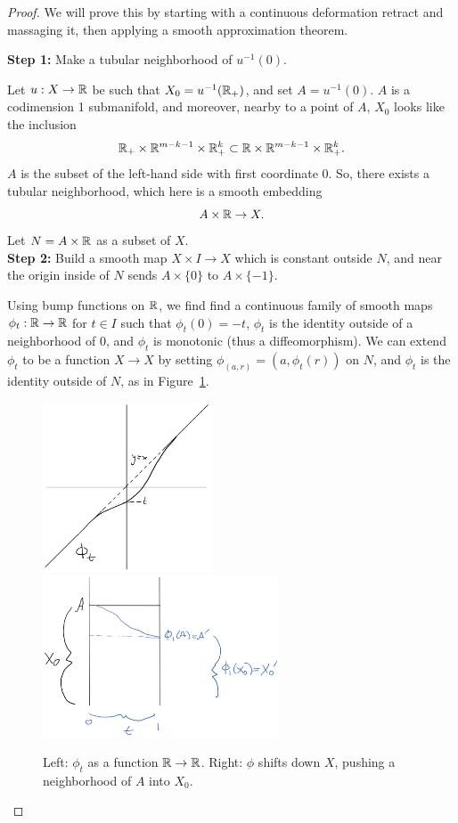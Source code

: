 \documentclass{article}
\newtheorem{proposed work}[theorem]{Proposed Work}
\begin{document}
\begin{proof}
  We will prove this by starting with a continuous deformation retract and massaging it, then applying a smooth approximation theorem.

\noindent  \textbf{Step 1:} Make a tubular neighborhood of $u^{-1}(0)$.

  Let $u:X\to \mathbb R$ be such that $X_0=u^{-1}(\mathbb R_+)$, and set $A=u^{-1}(0)$. $A$ is a codimension 1 submanifold, and moreover, nearby to a point of $A$, $X_0$ looks like the inclusion
  \[  
    \mathbb R_+\times \mathbb R^{m-k-1}\times \mathbb R_+^k\subset \mathbb R\times \mathbb R^{m-k-1}\times \mathbb R^k_+.
  \]
  $A$ is the subset of the left-hand side with first coordinate 0. So, there exists a tubular neighborhood, which here is a smooth embedding
  \[
    A\times \mathbb R\to X.
  \]
  Let $N=A\times \mathbb R$ as a subset of $X$.\\

\noindent  \textbf{Step 2:} Build a smooth map $X\times I\to X$ which is constant outside $N$, and near the origin inside of $N$ sends $A\times\{0\}$ to $A\times\{-1\}$.

  Using bump functions on $\mathbb R$, we find find a continuous family of smooth maps $\phi_t:\mathbb R \to \mathbb R$ for $t\in I$ such that $\phi_t(0)=-t$, $\phi_t$ is the identity outside of a neighborhood of $0$, and $\phi_t$ is monotonic (thus a diffeomorphism). We can extend $\phi_t$ to be a function $X\to X$ by setting $\phi_(a,r)=(a,\phi_t(r))$ on $N$, and $\phi_t$ is the identity outside of $N$, as in Figure~\ref{fig:phi_t}.

  \begin{figure}[h]
    
  \centering
\includegraphics[width=5cm]{phi_t_2}
\includegraphics[width=7cm]{phi_t}
\caption{Left: $\phi_t$ as a function $\mathbb R\to\mathbb R$. Right: $\phi$ shifts down $X$, pushing a neighborhood of $A$ into $X_0$.\label{fig:phi_t}}
\end{figure}



\end{proof}
\end{document}
